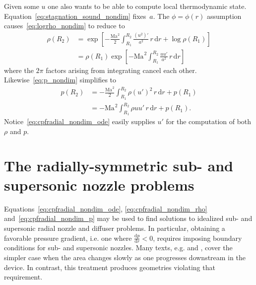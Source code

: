 \documentclass[letterpaper,11pt,nointlimits,reqno]{amsart}
\newcommand{\Mach}[1][]{\ensuremath{\mbox{Ma}_{#1}}}
\begin{document}
Given some $u$ one also wants to be able to compute local thermodynamic state.
Equation~\eqref{eq:stagnation_sound_nondim} fixes~$a$.  The $\phi=\phi(r)$
assumption causes~\eqref{eq:logrho_nondim} to reduce to
\begin{align}
  \rho\!\left(R_2\right)
  &=
  \exp\left[
    - \frac{\Mach^2}{2} \int_{R_1}^{R_2}
        \frac{\left(u^2\right)'}{a^2}
      \, r \, \mathrm{d}r
    + \log\rho\!\left(R_1\right)
  \right]
\\
  &=
  \rho\!\left(R_1\right) \exp\left[
    - \Mach^2 \int_{R_1}^{R_2}
        \frac{u u'}{a^2}
      \, r \, \mathrm{d}r
  \right]
\label{eq:cpfradial_nondim_rho}
\end{align}
where the $2\pi$ factors arising from integrating cancel each other.
Likewise~\eqref{eq:p_nondim} simplifies to
\begin{align}
  p\!\left(R_2\right)
  &=
    - \frac{\Mach^2}{2} \int_{R_1}^{R_2}
        \rho \left(u'\right)^2
      \, r \, \mathrm{d}r
    + p\!\left(R_1\right)
\\
  &=
    -\Mach^2 \int_{R_1}^{R_2} \rho u u' \, r \, \mathrm{d}r
      + p\!\left(R_1\right)
\label{eq:cpfradial_nondim_p}
.
\end{align}
Notice~\eqref{eq:cpfradial_nondim_ode} easily supplies $u'$ for the computation
of both $\rho$ and $p$.

\section{The radially-symmetric sub- and supersonic nozzle problems}

Equations~\eqref{eq:cpfradial_nondim_ode}, \eqref{eq:cpfradial_nondim_rho}
and~\eqref{eq:cpfradial_nondim_p} may be used to find solutions to idealized
sub- and supersonic radial nozzle and diffuser problems.  In particular,
obtaining a favorable pressure gradient, i.e. one where
$\frac{\mathrm{d}p}{\mathrm{d}r} < 0$, requires imposing boundary conditions
for sub- and supersonic nozzles.  Many texts, e.g.
\citet[\textsection{}9.4]{White1999Fluid} and
\citet[\textsection{}97]{Landau2004Fluid}, cover the simpler case when the area
changes slowly as one progresses downstream in the device.  In contrast, this
treatment produces geometries violating that requirement.
\end{document}
